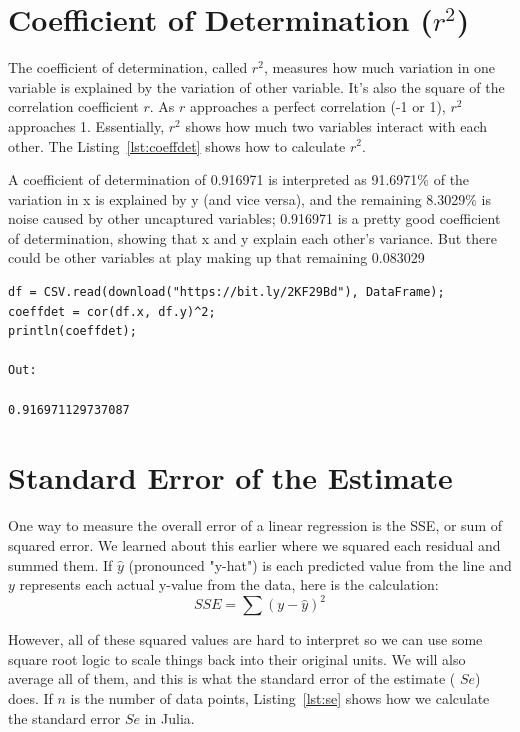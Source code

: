 \documentclass[a4paper, 11pt]{article}
\begin{document}
\section{Coefficient of Determination ($r^2$)}

The coefficient of determination, called $r^2$, measures how much variation in one variable is explained by the variation of other variable. It's also the square of the correlation coefficient $r$. As $r$ approaches a perfect correlation (-1 or 1), $r^2$ approaches 1. Essentially, $r^2$ shows how much two variables interact with each other. The Listing~\ref{lst:coeffdet} shows how to calculate $r^2$.

A coefficient of determination of 0.916971 is interpreted as 91.6971\% of
the variation in x is explained by y (and vice versa), and the remaining
8.3029\% is noise caused by other uncaptured variables; 0.916971 is a pretty
good coefficient of determination, showing that x and y explain each other's
variance. But there could be other variables at play making up that
remaining 0.083029

\begin{lstlisting}[caption={Creating a correlation matrix and squaring it},label={lst:coeffdet}]
df = CSV.read(download("https://bit.ly/2KF29Bd"), DataFrame);
coeffdet = cor(df.x, df.y)^2;
println(coeffdet);

Out:

0.916971129737087
\end{lstlisting}

\section{Standard Error of the Estimate}

One way to measure the overall error of a linear regression is the SSE, or
sum of squared error. We learned about this earlier where we squared each
residual and summed them. If $\hat{y}$ (pronounced "y-hat") is each predicted
value from the line and $y$ represents each actual y-value from the data, here
is the calculation:
$$
SSE = \sum(y - \hat{y})^2
$$

However, all of these squared values are hard to interpret so we can use
some square root logic to scale things back into their original units. We will
also average all of them, and this is what the standard error of the estimate (
$Se$) does. If $n$ is the number of data points, Listing~\ref{lst:se} shows how we
calculate the standard error $Se$ in Julia.
\end{document}
